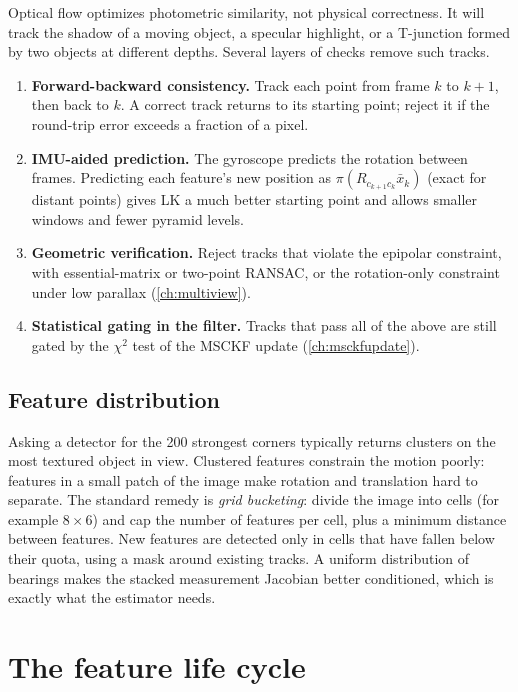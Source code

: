 Optical flow optimizes photometric similarity, not physical correctness. It will track the shadow of a moving object,
a specular highlight, or a T-junction formed by two objects at different depths. Several layers of checks remove such
tracks.
\begin{enumerate}
  \item \textbf{Forward-backward consistency.} Track each point from frame $k$ to $k+1$, then back to $k$. A correct track
        returns to its starting point; reject it if the round-trip error exceeds a fraction of a pixel.
  \item \textbf{IMU-aided prediction.} The gyroscope predicts the rotation between frames. Predicting each feature's new
        position as $\pi(R_{c_{k+1}c_k}\bar x_k)$ (exact for distant points) gives LK a much better starting point and
        allows smaller windows and fewer pyramid levels.
  \item \textbf{Geometric verification.} Reject tracks that violate the epipolar constraint, with essential-matrix or
        two-point RANSAC, or the rotation-only constraint under low parallax (\cref{ch:multiview}).
  \item \textbf{Statistical gating in the filter.} Tracks that pass all of the above are still gated by the $\chi^2$ test
        of the MSCKF update (\cref{ch:msckfupdate}).
\end{enumerate}

\subsection{Feature distribution}

Asking a detector for the 200 strongest corners typically returns clusters on the most textured object in view.
Clustered features constrain the motion poorly: features in a small patch of the image make rotation and
translation hard to separate. The standard remedy is \emph{grid bucketing}: divide the image into cells (for example
$8\times6$) and cap the number of features per cell, plus a minimum distance between features. New features are
detected only in cells that have fallen below their quota, using a mask around existing tracks. A uniform distribution
of bearings makes the stacked measurement Jacobian better conditioned, which is exactly what the estimator needs.

\section{The feature life cycle}

